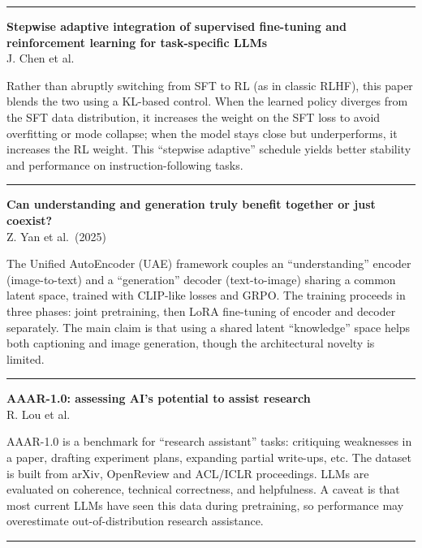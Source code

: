 \documentclass[a5paper]{article}
\begin{document}
\begin{center}\rule{0.5\linewidth}{0.5pt}\end{center}

\textbf{Stepwise adaptive integration of supervised fine-tuning and
reinforcement learning for task-specific LLMs}\\
J. Chen et al.

Rather than abruptly switching from SFT to RL (as in classic RLHF), this
paper blends the two using a KL-based control. When the learned policy
diverges from the SFT data distribution, it increases the weight on the
SFT loss to avoid overfitting or mode collapse; when the model stays
close but underperforms, it increases the RL weight. This ``stepwise
adaptive'' schedule yields better stability and performance on
instruction-following tasks.

\begin{center}\rule{0.5\linewidth}{0.5pt}\end{center}

\textbf{Can understanding and generation truly benefit together or just
coexist?}\\
Z. Yan et al.~(2025)

The Unified AutoEncoder (UAE) framework couples an ``understanding''
encoder (image-to-text) and a ``generation'' decoder (text-to-image)
sharing a common latent space, trained with CLIP-like losses and GRPO.
The training proceeds in three phases: joint pretraining, then LoRA
fine-tuning of encoder and decoder separately. The main claim is that
using a shared latent ``knowledge'' space helps both captioning and
image generation, though the architectural novelty is limited.

\begin{center}\rule{0.5\linewidth}{0.5pt}\end{center}

\textbf{AAAR-1.0: assessing AI's potential to assist research}\\
R. Lou et al.

AAAR-1.0 is a benchmark for ``research assistant'' tasks: critiquing
weaknesses in a paper, drafting experiment plans, expanding partial
write-ups, etc. The dataset is built from arXiv, OpenReview and ACL/ICLR
proceedings. LLMs are evaluated on coherence, technical correctness, and
helpfulness. A caveat is that most current LLMs have seen this data
during pretraining, so performance may overestimate out-of-distribution
research assistance.

\begin{center}\rule{0.5\linewidth}{0.5pt}\end{center}
\end{document}
